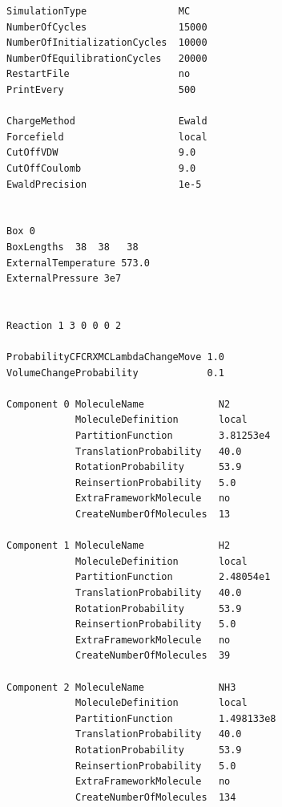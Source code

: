 \begin{verbatim}
SimulationType                MC
NumberOfCycles                15000
NumberOfInitializationCycles  10000
NumberOfEquilibrationCycles   20000
RestartFile                   no
PrintEvery                    500

ChargeMethod                  Ewald
Forcefield                    local
CutOffVDW                     9.0
CutOffCoulomb                 9.0
EwaldPrecision                1e-5


Box 0
BoxLengths  38  38   38
ExternalTemperature 573.0
ExternalPressure 3e7


Reaction 1 3 0 0 0 2

ProbabilityCFCRXMCLambdaChangeMove 1.0
VolumeChangeProbability            0.1

Component 0 MoleculeName             N2
            MoleculeDefinition       local
            PartitionFunction        3.81253e4
            TranslationProbability   40.0
            RotationProbability      53.9
            ReinsertionProbability   5.0
            ExtraFrameworkMolecule   no
            CreateNumberOfMolecules  13

Component 1 MoleculeName             H2
            MoleculeDefinition       local
            PartitionFunction        2.48054e1
            TranslationProbability   40.0
            RotationProbability      53.9
            ReinsertionProbability   5.0
            ExtraFrameworkMolecule   no
            CreateNumberOfMolecules  39

Component 2 MoleculeName             NH3
            MoleculeDefinition       local
            PartitionFunction        1.498133e8
            TranslationProbability   40.0
            RotationProbability      53.9
            ReinsertionProbability   5.0
            ExtraFrameworkMolecule   no
            CreateNumberOfMolecules  134
\end{verbatim}



